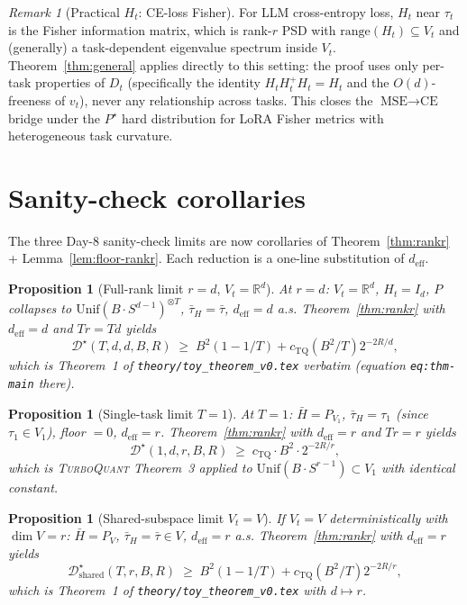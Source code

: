 \documentclass{article}
\newtheorem{proposition}[theorem]{Proposition}
\theoremstyle{remark}
\newtheorem{remark}[theorem]{Remark}
\newcommand{\R}{\mathbb{R}}
\newcommand{\range}{\mathrm{range}}
\newcommand{\deff}{d_{\mathrm{eff}}}
\newcommand{\tauH}{\bar\tau_{H}}
\begin{document}
\begin{remark}[Practical $H_t$: CE-loss Fisher]
For LLM cross-entropy loss, $H_t$ near $\tau_t$ is the Fisher
information matrix, which is rank-$r$ PSD with $\range(H_t)
\subseteq V_t$ and (generally) a task-dependent eigenvalue spectrum
inside $V_t$. Theorem~\ref{thm:general} applies directly to this
setting: the proof uses only per-task properties of $D_t$
(specifically the identity $H_t H_t^+ H_t = H_t$ and the
$O(d)$-freeness of $v_t$), never any relationship across tasks.
This closes the $\text{MSE}\to\text{CE}$ bridge under the
$P^\star$ hard distribution for LoRA Fisher metrics with
heterogeneous task curvature.
\end{remark}

\section{Sanity-check corollaries}\label{sec:limits}

The three Day-8 sanity-check limits are now corollaries of
Theorem~\ref{thm:rankr} + Lemma~\ref{lem:floor-rankr}. Each reduction
is a one-line substitution of $\deff$.

\begin{proposition}[Full-rank limit $r=d$, $V_t = \R^d$]\label{prop:full}
At $r=d$: $V_t = \R^d$, $H_t = I_d$, $P$ collapses to
$\mathrm{Unif}(B\cdot S^{d-1})^{\otimes T}$, $\tauH = \bar\tau$,
$\deff = d$ a.s. Theorem~\ref{thm:rankr} with $\deff = d$ and
$Tr = Td$ yields
\[
  \mathcal{D}^\star(T,d,d,B,R)
  \;\geq\; B^2(1-1/T) + c_{\mathrm{TQ}}(B^2/T) 2^{-2R/d},
\]
which is Theorem~1 of \texttt{theory/toy\_theorem\_v0.tex} verbatim
(equation \texttt{eq:thm-main} there).
\end{proposition}

\begin{proposition}[Single-task limit $T=1$]\label{prop:T1}
At $T=1$: $\bar H = P_{V_1}$, $\tauH = \tau_1$ (since $\tau_1\in V_1$),
floor $= 0$, $\deff = r$. Theorem~\ref{thm:rankr} with $\deff = r$
and $Tr = r$ yields
\[
  \mathcal{D}^\star(1, d, r, B, R) \;\geq\; c_{\mathrm{TQ}}\cdot B^2
  \cdot 2^{-2R/r},
\]
which is \textsc{TurboQuant} Theorem~3 applied to
$\mathrm{Unif}(B\cdot S^{r-1})\subset V_1$ with identical constant.
\end{proposition}

\begin{proposition}[Shared-subspace limit $V_t = V$]\label{prop:shared}
If $V_t = V$ deterministically with $\dim V = r$: $\bar H = P_V$,
$\tauH = \bar\tau\in V$, $\deff = r$ a.s. Theorem~\ref{thm:rankr} with
$\deff = r$ yields
\[
  \mathcal{D}^\star_{\text{shared}}(T, r, B, R)
  \;\geq\; B^2(1-1/T) + c_{\mathrm{TQ}}(B^2/T) 2^{-2R/r},
\]
which is Theorem~1 of \texttt{theory/toy\_theorem\_v0.tex} with
$d \mapsto r$.
\end{proposition}
\end{document}
